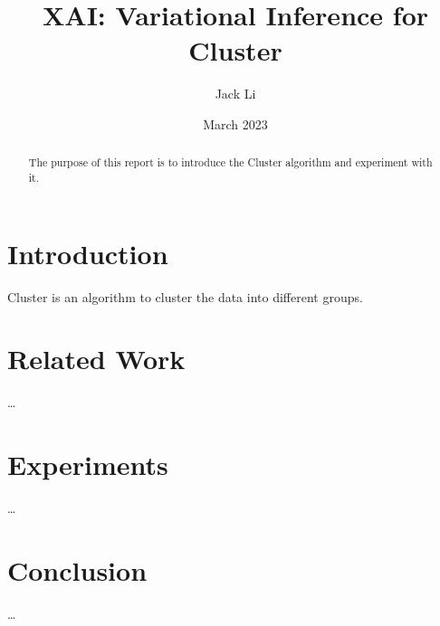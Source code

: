 \documentclass[a4paper,12pt]{article}
\title{XAI: Variational Inference for Cluster}
\author{Jack Li}
\date{March 2023}
\begin{document}
\maketitle

\begin{abstract}
The purpose of this report is to introduce the Cluster algorithm and experiment with it.
\end{abstract}

\section{Introduction}
Cluster is an algorithm to cluster the data into different groups.

\section{Related Work}
\ldots

\section{Experiments}
\ldots

\section{Conclusion}
\ldots
\end{document}
